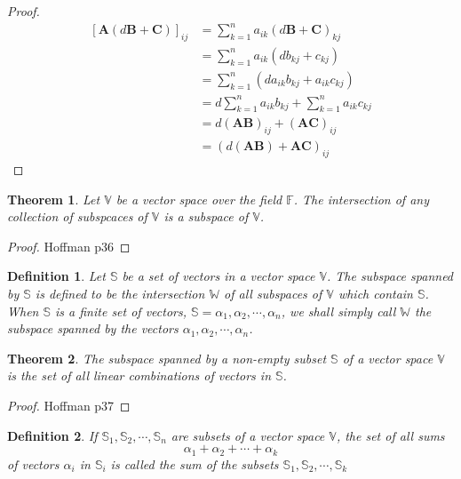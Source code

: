 \documentclass{article}
\newtheorem*{definition}{Definition}
\newtheorem{theorem}{Theorem}
\begin{document}
    \begin{proof}
        \begin{equation*}
            \begin{split}
                [\mathbf{A}(d \mathbf{B} + \mathbf{C})]_{ij} &= \sum_{k=1}^{n} a_{ik}(d \mathbf{B} + \mathbf{C})_{kj}\\
                                                             &= \sum_{k=1}^{n} a_{ik}(d b_{kj} + c_{kj})\\
                                                             &= \sum_{k=1}^{n} (d a_{ik} b_{kj} + a_{ik} c_{kj})\\
                                                             &= d \sum_{k=1}^{n} a_{ik} b_{kj} + \sum_{k=1}^{n} a_{ik} c_{kj}\\
                                                             &= d(\mathbf{A} \mathbf{B})_{ij} + (\mathbf{A} \mathbf{C})_{ij}\\
                                                             &= (d (\mathbf{A} \mathbf{B}) + \mathbf{A} \mathbf{C})_{ij}
            \end{split}
        \end{equation*}
    \end{proof}
    \begin{theorem}
        Let \(\mathbb{V}\) be a vector space over the field \(\mathbb{F}\). The intersection
        of any collection of subspcaces of \(\mathbb{V}\) is a subspace of \(\mathbb{V}\).
    \end{theorem}
    \begin{proof}
        Hoffman p36
    \end{proof}
    \begin{definition}
        Let \(\mathbb{S}\) be a set of vectors in a vector space \(\mathbb{V}\). The subspace
        spanned by \(\mathbb{S}\) is defined to be the intersection \(\mathbb{W}\) of all 
        subspaces of \(\mathbb{V}\) which contain \(\mathbb{S}\). When \(\mathbb{S}\) is a 
        finite set of vectors, \(\mathbb{S} = {\alpha_1, \alpha_2, \cdots, \alpha_n}\), we 
        shall simply call \(\mathbb{W}\) the subspace spanned by the vectors \(\alpha_1, \alpha_2, \cdots, \alpha_n\).
    \end{definition}
    \begin{theorem}
        The subspace spanned by a non-empty subset \(\mathbb{S}\) of a vector space \(\mathbb{V}\)
        is the set of all linear combinations of vectors in \(\mathbb{S}\).
    \end{theorem}
    \begin{proof}
        Hoffman p37
    \end{proof}
    \begin{definition}
        If \(\mathbb{S}_1, \mathbb{S}_2, \cdots, \mathbb{S}_n\) are subsets of a vector
        space \(\mathbb{V}\), the set of all sums
        \begin{equation*}
            \alpha_1 + \alpha_2 + \cdots + \alpha_k
        \end{equation*}
        of vectors \(\alpha_{i}\) in \(\mathbb{S}_i\) is called the sum of the subsets
        \(\mathbb{S}_1, \mathbb{S}_2, \cdots, \mathbb{S}_k\)
    \end{definition}
\end{document}
